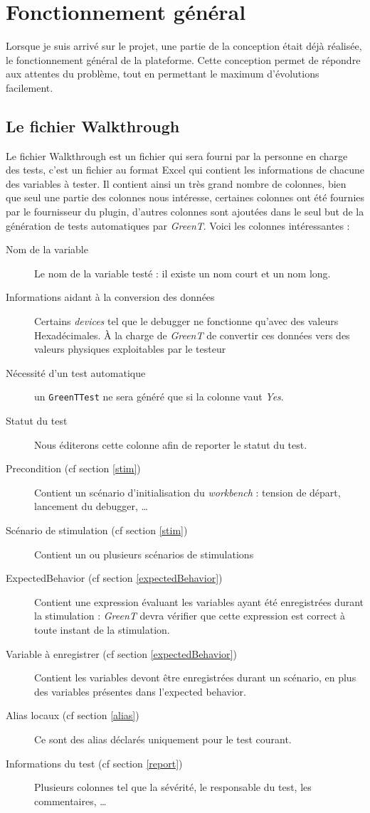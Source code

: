 	\section{Fonctionnement général}
	Lorsque je suis arrivé sur le projet, une partie de la conception était déjà réalisée, le fonctionnement général de la plateforme. Cette conception permet de répondre aux attentes du problème, tout en permettant le maximum d'évolutions facilement.
	
	\subsection{Le fichier Walkthrough}\label{wt}
		Le fichier Walkthrough est un fichier qui sera fourni par la personne en charge des tests, c'est un fichier au format Excel qui contient les informations de chacune des variables à tester. Il contient ainsi un très grand nombre de colonnes, bien que seul une partie des colonnes nous intéresse, certaines colonnes ont été fournies par le fournisseur du plugin, d'autres colonnes sont ajoutées dans le seul but de la génération de tests automatiques par \textit{GreenT}. Voici les colonnes intéressantes : 

		\begin{description} 
			\item[Nom de la variable] Le nom de la variable testé : il existe un nom court et un nom long.
			\item[Informations aidant à la conversion des données] Certains \textit{devices} tel que le debugger ne fonctionne qu'avec des valeurs Hexadécimales. À la charge de \textit{GreenT} de convertir ces données vers des valeurs physiques exploitables par le testeur
			\item[Nécessité d'un test automatique] un \texttt{GreenTTest} ne sera généré que si la colonne vaut \textit{Yes}.
			\item[Statut du test] Nous éditerons cette colonne afin de reporter le statut du test.
			\item[Precondition (cf section \ref{stim})] Contient un scénario d'initialisation du \textit{workbench} : tension de départ, lancement du debugger, \ldots
			\item[Scénario de stimulation (cf section \ref{stim})] Contient un ou plusieurs scénarios de stimulations
			\item[ExpectedBehavior (cf section \ref{expectedBehavior})] Contient une expression évaluant les variables ayant été enregistrées durant la stimulation : \textit{GreenT} devra vérifier que cette expression est correct à toute instant de la stimulation.
			\item[Variable à enregistrer (cf section \ref{expectedBehavior})] Contient les variables devont être enregistrées durant un scénario, en plus des variables présentes dans l'expected behavior.
			\item[Alias locaux (cf section \ref{alias})] Ce sont des alias déclarés uniquement pour le test courant.
			\item[Informations du test (cf section \ref{report})] Plusieurs colonnes tel que la sévérité, le responsable du test, les commentaires, \ldots
		\end{description}

